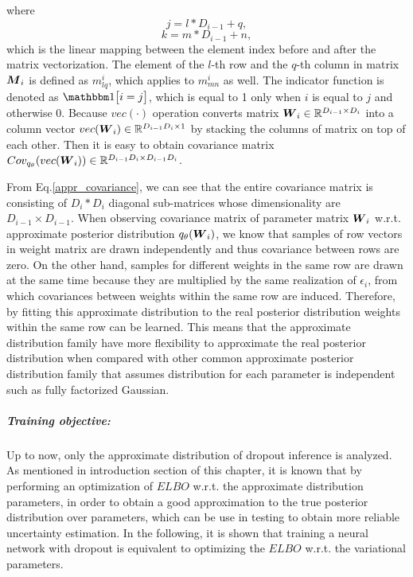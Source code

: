 where 
\[ j = l*D_{i-1} + q,\]
\[ k = m*D_{i-1} + n,\]
which is the linear mapping between the element index before and after the matrix vectorization. The element of the $l$-th row and the $q$-th column in matrix $\boldsymbol M_{i}$ is defined as $m^{i}_{lq}$, which applies to $m^{i}_{mn}$ as well. 
The indicator function is denoted as $\mathbbm 1 \big[i=j\big]$, which is equal to 1 only when $i$ is equal to $j$ and otherwise 0. Because $vec(\cdot)$ operation converts matrix $\boldsymbol W_{i} \in \mathbb R^{D_{i-1} \times D_{i}}$ into a column vector $ vec(\boldsymbol W_{i}) \in \mathbb R^{D_{i-1}D_{i} \times 1}$ by stacking the columns of matrix on top of each other. Then it is easy to obtain covariance matrix $Cov_{q_{\theta}}(vec(\boldsymbol W_{i})) \in \mathbb R^{D_{i-1}D_{i} \times D_{i-1}D_{i}} $. 

From Eq.\ref{appr_covariance}, we can see that the entire covariance matrix is consisting of $D_{i} \ast D_{i}$ diagonal sub-matrices whose dimensionality are $D_{i-1} \times D_{i-1}$.
When observing covariance matrix of parameter matrix $\boldsymbol W_{i}$ w.r.t. approximate posterior distribution $q_{\theta}({\boldsymbol W_{i}})$, we know that samples of row vectors in weight matrix are drawn independently and thus covariance between rows are zero. On the other hand, samples for different weights in the same row are drawn at the same time because they are multiplied by the same realization of $\epsilon_{i}$, from which covariances between weights within the same row are induced. Therefore, by fitting this approximate distribution to the real posterior distribution weights within the same row can be learned. This means that the approximate distribution family have more flexibility to approximate the real posterior distribution when compared with other common approximate posterior distribution family that assumes distribution for each parameter is independent such as fully factorized Gaussian.


\subparagraph{Training objective:} Up to now, only the approximate distribution of dropout inference is analyzed. 
As mentioned in introduction section of this chapter, it is known that by performing an optimization of $ELBO$ w.r.t. the approximate distribution parameters, in order to obtain a good approximation to the true posterior distribution over parameters, which can be use in testing to obtain more reliable uncertainty estimation. 
In the following, it is shown that training a neural network with dropout is equivalent to optimizing the $ELBO$ w.r.t. the variational parameters.

